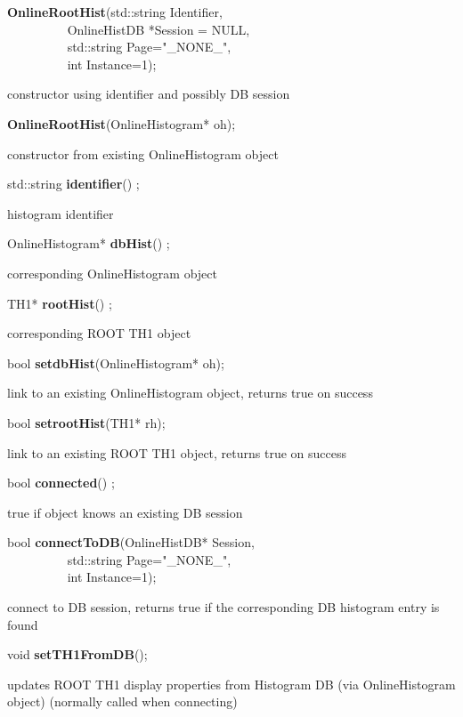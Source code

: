 \item    {\bf OnlineRootHist}(std::string Identifier,\\\mbox{}~~~~~~~~~
		 OnlineHistDB *Session = NULL,\\\mbox{}~~~~~~~~~
		 std::string Page="\_NONE\_",\\\mbox{}~~~~~~~~~
		 int Instance=1);

 constructor using identifier and possibly DB session


\item    {\bf OnlineRootHist}(OnlineHistogram*  oh);


 constructor from existing OnlineHistogram object


\item    std::string {\bf identifier}()  ;

 histogram identifier


\item    OnlineHistogram* {\bf dbHist}() ;

 corresponding OnlineHistogram object


\item    TH1* {\bf rootHist}() ;

 corresponding ROOT TH1 object


\item    bool {\bf setdbHist}(OnlineHistogram*  oh);


 link to an existing OnlineHistogram object, returns true on success


\item    bool {\bf setrootHist}(TH1*  rh);


 link to an existing ROOT TH1 object, returns true on success


\item    bool {\bf connected}() ;

 true if object knows an existing DB session


\item    bool {\bf connectToDB}(OnlineHistDB* Session,\\\mbox{}~~~~~~~~~
		   std::string Page="\_NONE\_",\\\mbox{}~~~~~~~~~
		   int Instance=1);

 connect to DB session, returns true if the corresponding DB histogram entry is found


\item    void {\bf setTH1FromDB}();


 updates ROOT TH1 display properties from Histogram DB (via OnlineHistogram object) 
 (normally called when connecting)


